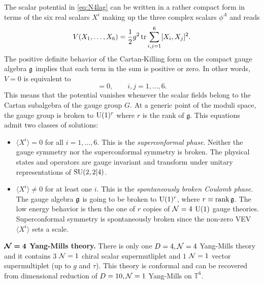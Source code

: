             The scalar potential in \eqref{eq:N4lag} can be written in a rather compact form in terms of the six real scalars $X^i$ making up the three complex scalars $\phi^A$ and reads
            \begin{equation}
                V(X_1,\dots,X_6) = \frac{1}{2}g^2\tr\sum^6_{i,j=1}[X_i,X_j]^2.
            \end{equation}
            The positive definite behavior of the Cartan-Killing form on the compact gauge algebra $\mathfrak{g}$ implies that each term in the sum is positive or zero. In other words, $V=0$ is equivalent to
            \begin{equation}
                [X^i,X^j]=0,\qquad i,j=1,\dots,6.
            \end{equation}
            This means that the potential vanishes whenever the scalar fields belong to the Cartan subalgebra of the gauge group $G$. At a generic point of the moduli space, the gauge group is broken to $\text{U}(1)^r$ where $r$ is the rank of $\mathfrak{g}$.
            This equations admit two classes of solutions:
            \begin{itemize}
                \item $\langle X^i\rangle=0$ for all $i=1,\dots,6$. This is the \emph{superconformal phase}. Neither the gauge symmetry nor the superconformal symmetry is broken. The physical states and operators are gauge invariant and transform under
                unitary representations of $\text{SU}(2,2|4)$.
                \item  $\langle X^i\rangle\neq0$ for at least one $i$. This is the \emph{spontaneously broken Coulomb phase}. The gauge algebra $\mathfrak{g}$ is going to be broken to $\text{U}(1)^r$, where $r\equiv\rank\mathfrak{g}$. The low energy behavior is then the one of $r$ copies of $\mathcal{N}=4$ $\text{U}(1)$ gauge theories. Superconformal symmetry is spontaneously broken since the non-zero VEV $\langle X^i\rangle$ sets a scale.
            \end{itemize}

            \begin{result}
                \textbf{$\boldsymbol{\mathcal{N}=4}$ Yang-Mills theory.} There is only one $D=4,\mathcal{N}=4$ Yang-Mills theory and it contains $3$ $\mathcal{N}=1$ chiral scalar supermutliplet and $1$ $\mathcal{N}=1$ vector supermultiplet (up to $g$ and $\tau$). This theory is conformal and can be recovered from dimensional reduction of $D=10,\mathcal{N}=1$ Yang-Mills on $\mathbb{T}^6$.
            \end{result}
        
